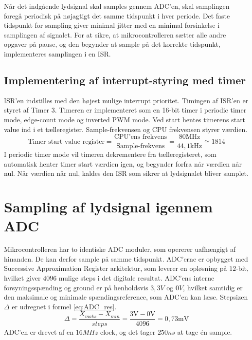 Når det indgående lydsignal skal samples gennem ADC'en, skal samplingen foregå periodisk på nøjagtigt det samme tidspunkt i hver periode.
Det faste tidspunkt for sampling giver minimal jitter med en minimal forsinkelse i samplingen af signalet. 
For at sikre, at mikrocontrolleren sætter alle andre opgaver på pause, og den begynder at sample på det korrekte tidspunkt, implementeres samplingen i en ISR.

\subsection{Implementering af interrupt-styring med timer}
\label{subsec:impl_int}
ISR'en indstilles med den højest mulige interrupt prioritet. 
Timingen af ISR'en er styret af Timer 3. 
Timeren er implementeret som en 16-bit timer i periodic timer mode, edge-count mode og inverted PWM mode.
Ved start hentes timerens start value ind i et tælleregister. 
Sample-frekvensen og CPU frekvensen styrer værdien. 
\begin{equation}
	\text{Timer start value register} = \frac{\text{CPU'ens frekvens}}{\text{Sample-frekvens}} = \frac{80\text{MHz}}{44,1\text{kHz}} \simeq 1814
\end{equation}
I periodic timer mode vil timeren dekrementere fra tælleregisteret, som automatisk henter timer start værdien igen, og begynder forfra når værdien når nul. 
Når værdien når nul, kaldes den ISR som sikrer at lydsignalet bliver samplet. \newline

\section{Sampling af lydsignal igennem ADC}\label{sec:ADC}
Mikrocontrolleren har to identiske ADC moduler, som opererer uafhængigt af hinanden. 
De kan derfor sample på samme tidspunkt. 
ADC'erne er opbygget med Successive Approximation Register arkitektur, som leverer en opløsning på $12$-bit, hvilket giver $4096$ mulige steps i det digitale resultat. 
ADC'ens interne forsyningsspænding og ground er på henholdsvis $3,3\si{V}$ og $0\si{V}$, hvilket samtidig er den maksimale og minimale spændingsreference, som ADC'en kan læse. 
Stepsizen $\Delta$ er udregnet i formel \ref{eq:ADC_res}.
\begin{equation}
\label{eq:ADC_res}
	\Delta = \frac{X_{maks}-X_{min}}{steps} = \frac{3\text{V}-0\text{V}}{4096} = 0,73\text{mV}
\end{equation}
ADC'en er drevet af en $16\si{MHz}$ clock, og det tager $250\si{ns}$ at tage én sample. 

